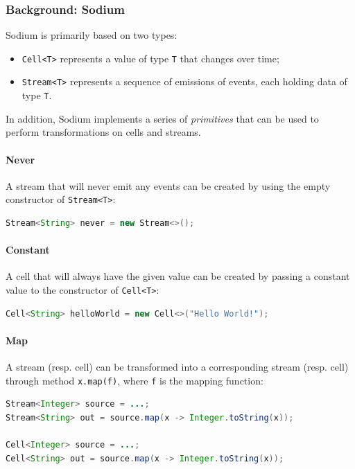  

\subsubsection{Background: Sodium}
Sodium is primarily based on two types:
%
\begin{itemize}
  \item \texttt{Cell<T>} represents a value of type \texttt{T} that changes over time;
  \item \texttt{Stream<T>} represents a sequence of emissions of events, each holding data of type \texttt{T}.
\end{itemize}
%
In addition, Sodium implements a series of \textit{primitives} that can be used to perform transformations on cells and streams. 

\paragraph{Never}
A stream that will never emit any events can be created by using the empty constructor of \texttt{Stream<T>}:
%
\begin{lstlisting}[frame=single, language=java]
Stream<String> never = new Stream<>();
\end{lstlisting}

\paragraph{Constant}
A cell that will always have the given value can be created by passing a constant value to the constructor of \texttt{Cell<T>}:
%
\begin{lstlisting}[frame=single, language=java]
Cell<String> helloWorld = new Cell<>("Hello World!");
\end{lstlisting}


\paragraph{Map}
A stream (resp. cell) can be transformed into a corresponding stream (resp. cell) through method  \texttt{x.map(f)}, where \texttt{f} is the mapping function:
%
\begin{lstlisting}[frame=single, language=java]
Stream<Integer> source = ...;
Stream<String> out = source.map(x -> Integer.toString(x));

Cell<Integer> source = ...;
Cell<String> out = source.map(x -> Integer.toString(x));
\end{lstlisting}  

